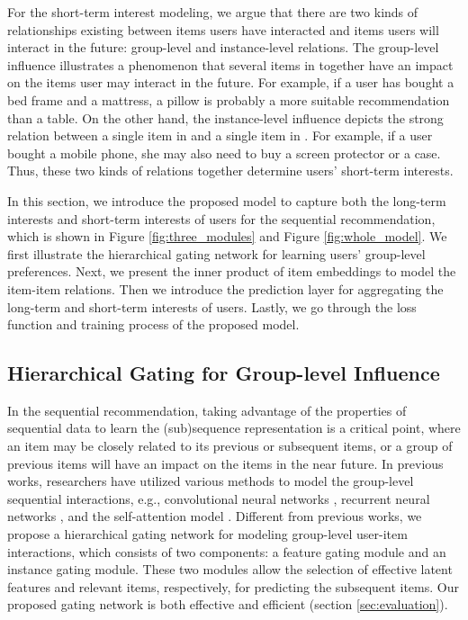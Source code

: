 \documentclass[sigconf]{acmart}
\begin{document}
For the short-term interest modeling, we argue that there are two kinds of relationships existing between items users have interacted and items users will interact in the future: group-level and instance-level relations. The group-level influence illustrates a phenomenon that several items in  together have an impact on the items user may interact in the future. For example, if a user has bought a bed frame and a mattress, a pillow is probably a more suitable recommendation than a table. On the other hand, the instance-level influence depicts the strong relation between a single item in  and a single item in . For example, if a user bought a mobile phone, she may also need to buy a screen protector or a case. Thus, these two kinds of relations together determine users' short-term interests.

In this section, we introduce the proposed model to capture both the long-term interests and short-term interests of users for the sequential recommendation, which is shown in Figure \ref{fig:three_modules} and Figure \ref{fig:whole_model}. We first illustrate the hierarchical gating network for learning users' group-level preferences. Next, we present the inner product of item embeddings to model the item-item relations. Then we introduce the prediction layer for aggregating the long-term and short-term interests of users. Lastly, we go through the loss function and training process of the proposed model. 

\subsection{Hierarchical Gating for Group-level Influence}
In the sequential recommendation, taking advantage of the properties of sequential data to learn the (sub)sequence representation is a critical point, where an item may be closely related to its previous or subsequent items, or a group of previous items will have an impact on the items in the near future. In previous works, researchers have utilized various methods to model the group-level sequential interactions, e.g., convolutional neural networks \cite{DBLP:conf/wsdm/TangW18}, recurrent neural networks \cite{DBLP:journals/corr/HidasiKBT15,DBLP:conf/cikm/PeiYSZBT17,DBLP:conf/recsys/QuadranaKHC17,DBLP:conf/cikm/HidasiK18}, and the self-attention model \cite{DBLP:conf/icdm/KangM18}. Different from previous works, we propose a hierarchical gating network for modeling group-level user-item interactions, which consists of two components: a feature gating module and an instance gating module. These two modules allow the selection of effective latent features and relevant items, respectively, for predicting the subsequent items. Our proposed gating network is both effective and efficient (section \ref{sec:evaluation}).
\end{document}
